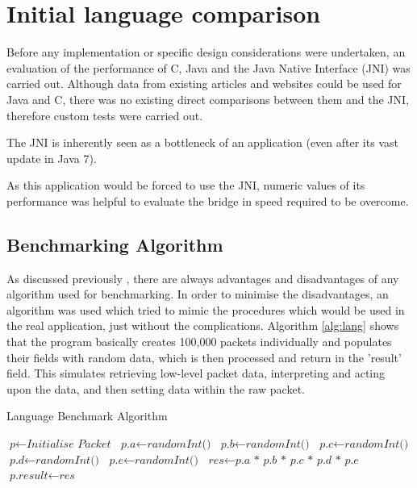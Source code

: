 \documentclass[final_report.tex]{subfiles}
\begin{document}
\section{Initial language comparison}
Before any implementation or specific design considerations were undertaken, an evaluation of the performance of C, Java and the Java Native Interface (JNI) was carried out. Although data from existing articles and websites could be used for Java and C, there was no existing direct comparisons between them and the JNI, therefore custom tests were carried out.

The JNI is inherently  seen as a bottleneck of an application (even after its vast update in Java 7). 

As this application would be forced to use the JNI, numeric values of its performance was helpful to evaluate the bridge in speed required to be overcome.

\subsection{Benchmarking Algorithm}
As discussed previously , there are always advantages and disadvantages of any algorithm used for benchmarking. In order to minimise the disadvantages, an algorithm was used which tried to mimic the procedures which would be used in the real application, just without the complications. Algorithm \ref{alg:lang} shows that the program basically creates 100,000 packets individually and populates their fields with random data, which is then processed and return in the 'result' field. This simulates retrieving low-level packet data, interpreting and acting upon the data, and then setting data within the raw packet.

\begin{algorithm}[H]
	\caption{Language Benchmark Algorithm}
	\label{alg:lang}
	\begin{algorithmic}[1]
				\State $\textit{p} \gets \textit{Initialise Packet}$
				\State {}
				\State {}
			\EndFor
		\EndFunction
		\newline
		 
			\State $\textit{p.a} \gets \textit{randomInt()}$
			\State $\textit{p.b} \gets \textit{randomInt()}$
			\State $\textit{p.c} \gets \textit{randomInt()}$
			\State $\textit{p.d} \gets \textit{randomInt()}$
			\State $\textit{p.e} \gets \textit{randomInt()}$
		\EndFunction
		\newline
		 
			\State $\textit{res} \gets \textit{p.a * p.b * p.c * p.d * p.e}$
			\State $\textit{p.result} \gets \textit{res}$
		\EndFunction
	\end{algorithmic}
\end{algorithm}
\end{document}
